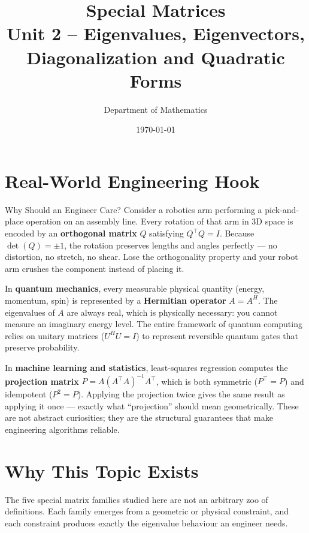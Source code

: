 \documentclass[12pt,a4paper]{article}
\title{\textbf{Special Matrices} \\ \large Unit 2 -- Eigenvalues, Eigenvectors, Diagonalization and Quadratic Forms}
\author{Department of Mathematics}
\date{\today}
\begin{document}
\maketitle
\tableofcontents
\newpage

\section{Real-World Engineering Hook}

\begin{curiositybox}{Why Should an Engineer Care?}
Consider a robotics arm performing a pick-and-place operation on an assembly line.
Every rotation of that arm in 3D space is encoded by an \textbf{orthogonal matrix} $Q$ satisfying $Q^\top Q = I$.
Because $\det(Q) = \pm 1$, the rotation preserves lengths and angles perfectly --- no distortion, no stretch, no shear.
Lose the orthogonality property and your robot arm crushes the component instead of placing it.

In \textbf{quantum mechanics}, every measurable physical quantity (energy, momentum, spin) is represented by a \textbf{Hermitian operator} $A = A^H$.
The eigenvalues of $A$ are always real, which is physically necessary: you cannot measure an imaginary energy level.
The entire framework of quantum computing relies on unitary matrices ($U^H U = I$) to represent reversible quantum gates that preserve probability.

In \textbf{machine learning and statistics}, least-squares regression computes the \textbf{projection matrix} $P = A(A^\top A)^{-1}A^\top$,
which is both symmetric ($P^\top = P$) and idempotent ($P^2 = P$).
Applying the projection twice gives the same result as applying it once --- exactly what ``projection'' should mean geometrically.
These are not abstract curiosities; they are the structural guarantees that make engineering algorithms reliable.
\end{curiositybox}

\section{Why This Topic Exists}

The five special matrix families studied here are not an arbitrary zoo of definitions.
Each family emerges from a geometric or physical constraint, and each constraint produces exactly the eigenvalue behaviour an engineer needs.
\end{document}
